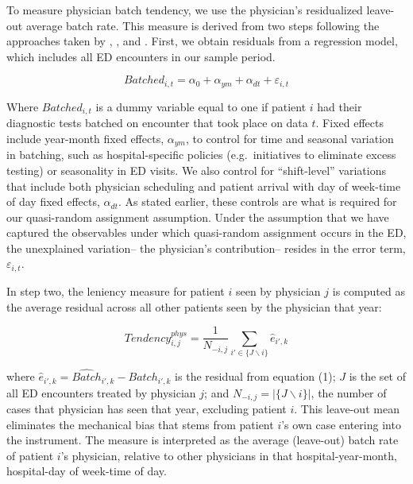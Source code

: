 \documentclass[,,nonblindrev]{informs}
\begin{document}
To measure physician batch tendency, we use the physician's residualized
leave-out average batch rate. This measure is derived from two steps
following the approaches taken by \citet{doyle2015measuring},
\citet{dobbie2018effects}, and \citet{eichmeyer2022pathways}. First, we
obtain residuals from a regression model, which includes all ED
encounters in our sample period.

\begin{equation}
Batched_{i,t} = \alpha_0 + \alpha_{ym} + \alpha_{dt} + \varepsilon_{i,t}
\end{equation}

Where \(Batched_{i,t}\) is a dummy variable equal to one if patient
\(i\) had their diagnostic tests batched on encounter that took place on
data \(t\). Fixed effects include year-month fixed effects,
\(\alpha_{ym}\), to control for time and seasonal variation in batching,
such as hospital-specific policies (e.g.~initiatives to eliminate excess
testing) or seasonality in ED visits. We also control for
``shift-level'' variations that include both physician scheduling and
patient arrival with day of week-time of day fixed effects,
\(\alpha_{dt}\). As stated earlier, these controls are what is required
for our quasi-random assignment assumption. Under the assumption that we
have captured the observables under which quasi-random assignment occurs
in the ED, the unexplained variation-- the physician's contribution--
resides in the error term, \(\varepsilon_{i,t}\).

In step two, the leniency measure for patient \(i\) seen by physician
\(j\) is computed as the average residual across all other patients seen
by the physician that year:

\begin{equation}
Tendency_{i,j}^{phys} =
\frac{1}{N_{-i,j}} \sum_{i' \in \{J \backslash i\}}\hat{e}_{i',k}
\end{equation}

where \(\hat{e}_{i',k} = \hat{Batch}_{i',k} - Batch_{i',k}\) is the
residual from equation (1); \(J\) is the set of all ED encounters
treated by physician \(j\); and \(N_{-i,j} = |\{J \backslash i\}|\), the
number of cases that physician has seen that year, excluding patient
\(i\). This leave-out mean eliminates the mechanical bias that stems
from patient \(i\)'s own case entering into the instrument. The measure
is interpreted as the average (leave-out) batch rate of patient \(i\)'s
physician, relative to other physicians in that hospital-year-month,
hospital-day of week-time of day.
\end{document}
